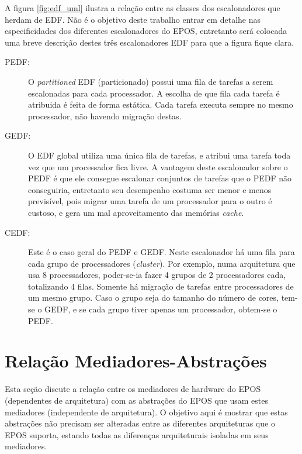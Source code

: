 A figura \ref{fig:edf_uml} ilustra a relação entre as classes dos escalonadores que herdam de EDF.  Não é o objetivo deste trabalho entrar em detalhe nas especificidades dos diferentes escalonadores do EPOS, entretanto será colocada uma breve descrição destes três escalonadores EDF para que a figura fique clara.

\begin{description}

\item[PEDF:] O \emph{partitioned} EDF (particionado) possui uma fila de tarefas a serem escalonadas para cada processador. A escolha de que fila cada tarefa é atribuida é feita de forma estática. Cada tarefa executa sempre no mesmo processador, não havendo migração destas. 

\item[GEDF:] O EDF global utiliza uma única fila de tarefas, e atribui uma tarefa toda vez que um processador fica livre. A vantagem deste escalonador sobre o PEDF é que ele consegue escalonar conjuntos de tarefas que o PEDF não conseguiria, entretanto seu desempenho costuma ser menor e menos previsível, pois migrar uma tarefa de um processador para o outro é custoso, e gera um mal aproveitamento das memórias \emph{cache}.

\item[CEDF:] Este é o caso geral do PEDF e GEDF. Neste escalonador há uma fila para cada grupo de processadores (\emph{cluster}). Por exemplo, numa arquitetura que usa 8 processadores, poder-se-ia fazer 4 grupos de 2 processadores cada, totalizando 4 filas. Somente há migração de tarefas entre processadores de um mesmo grupo. Caso o grupo seja do tamanho do número de cores, tem-se o GEDF, e se cada grupo tiver apenas um processador, obtem-se o PEDF.

\end{description}

\section{Relação Mediadores-Abstrações}

Esta seção discute a relação entre os mediadores de hardware do EPOS (dependentes de arquitetura) com as abstrações do EPOS que usam estes mediadores (independente de arquitetura). O objetivo aqui é mostrar que estas abstrações não precisam ser alteradas entre as diferentes arquiteturas que o EPOS suporta, estando todas as diferenças arquiteturais isoladas em seus mediadores.


